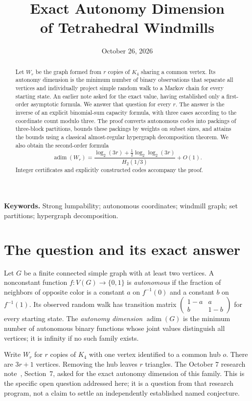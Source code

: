 \documentclass[11pt]{article}
\title{Exact Autonomy Dimension\\of Tetrahedral Windmills}
\author{}
\date{October 26, 2026}
\theoremstyle{definition}
\newcommand{\adim}{\operatorname{adim}}
\numberwithin{equation}{section}
\begin{document}
\maketitle

\begin{abstract}
Let $W_r$ be the graph formed from $r$ copies of $K_4$ sharing a common
vertex. Its autonomy dimension is the minimum number of binary
observations that separate all vertices and individually project simple
random walk to a Markov chain for every starting state. An earlier note
asked for the exact value, having established only a first-order
asymptotic formula. We answer that question for every $r$. The answer is
the inverse of an explicit binomial-sum capacity formula, with three cases
according to the coordinate count modulo three. The proof converts
autonomous codes into packings of three-block partitions, bounds these
packings by weights on subset sizes, and attains the bounds using a
classical almost-regular hypergraph decomposition theorem. We also obtain
the second-order formula
\[
 \adim(W_r)=
 \frac{\log_2(3r)+\tfrac12\log_2\log_2(3r)}{H_2(1/3)}+O(1).
\]
Integer certificates and explicitly constructed codes accompany the proof.
\end{abstract}

\noindent\textbf{Keywords.} Strong lumpability; autonomous coordinates;
windmill graph; set partitions; hypergraph decomposition.

\section{The question and its exact answer}

Let $G$ be a finite connected simple graph with at least two vertices.
A nonconstant function $f:V(G)\to\{0,1\}$ is \emph{autonomous} if the
fraction of neighbors of opposite color is a constant $a$ on $f^{-1}(0)$
and a constant $b$ on $f^{-1}(1)$. Its observed random walk has transition
matrix $\left(\begin{smallmatrix}1-a&a\\b&1-b\end{smallmatrix}\right)$ for
every starting state. The \emph{autonomy dimension} $\adim(G)$ is the
minimum number of autonomous binary functions whose joint values
distinguish all vertices; it is infinity if no such family exists.

Write $W_r$ for $r$ copies of $K_4$ with one vertex identified to a common
hub $o$. There are $3r+1$ vertices. Removing the hub leaves $r$ triangles.
The October 7 research note~\cite{previous}, Section~7, asked for the exact
autonomy dimension of this family. This is the specific open question
addressed here; it is a question from that research program, not a claim
to settle an independently established named conjecture.
\end{document}
